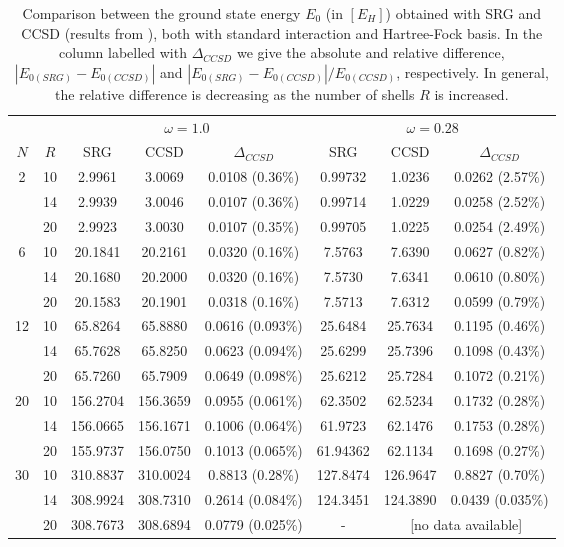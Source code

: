 \begin{table}[h!]
\begin{center}
\begin{tabular}{|c|c|c c c|c c c|}
\hline
\multicolumn{2}{|c|}{} &\multicolumn{3}{|c|}{$\omega=1.0$} &
 \multicolumn{3}{|c|}{$\omega=0.28$}\\
$N$ & $R$ & SRG & CCSD& $\Delta_{CCSD}$ & SRG & CCSD& $\Delta_{CCSD}$ \\
\hline
2 & 10 & 2.9961 & 3.0069 & 0.0108 (0.36\%) & 0.99732 & 1.0236 & 0.0262 (2.57\%)\\
  & 14 & 2.9939 & 3.0046 & 0.0107 (0.36\%) & 0.99714 & 1.0229 & 0.0258 (2.52\%) \\
  & 20 & 2.9923 & 3.0030 & 0.0107 (0.35\%) & 0.99705 & 1.0225 & 0.0254 (2.49\%) \\
\hline
6 & 10 & 20.1841 & 20.2161 & 0.0320 (0.16\%) & 7.5763 & 7.6390 & 0.0627 (0.82\%)\\
  & 14 & 20.1680 & 20.2000 & 0.0320 (0.16\%) & 7.5730 & 7.6341 & 0.0610 (0.80\%)\\
  & 20 & 20.1583 & 20.1901 & 0.0318 (0.16\%) &7.5713 & 7.6312 & 0.0599 (0.79\%)\\
  \hline
12& 10& 65.8264& 65.8880& 0.0616 (0.093\%) &25.6484 & 25.7634& 0.1195 (0.46\%)\\
  & 14& 65.7628& 65.8250& 0.0623 (0.094\%) &25.6299 & 25.7396& 0.1098 (0.43\%)\\
  & 20& 65.7260 & 65.7909& 0.0649 (0.098\%) &25.6212 & 25.7284& 0.1072 (0.21\%)\\
\hline
20 & 10 & 156.2704 & 156.3659 & 0.0955 (0.061\%) &62.3502 &62.5234 & 0.1732 (0.28\%) \\
 & 14 & 156.0665 & 156.1671 &0.1006 (0.064\%) &61.9723 &62.1476 &0.1753 (0.28\%) \\
 & 20 & 155.9737 & 156.0750 & 0.1013 (0.065\%) &61.94362 &62.1134 & 0.1698 (0.27\%) \\
 \hline
30 &10 &310.8837 & 310.0024& 0.8813 (0.28\%) & 127.8474& 126.9647 & 0.8827 (0.70\%)\\
   &14 &308.9924 & 308.7310& 0.2614 (0.084\%)& 124.3451& 124.3890 & 0.0439 (0.035\%) \\
   &20 &308.7673 & 308.6894& 0.0779 (0.025\%) & -& \multicolumn{2}{c|}{[no data available]}\\
\hline\hline
\end{tabular}
\end{center}
\caption{Comparison between the ground state energy $E_0$ (in $[E_H]$) obtained with SRG and CCSD (results from \cite{Christoffer}), both with standard interaction and Hartree-Fock basis. In the column labelled with $\Delta_{CCSD}$ we give the absolute and relative difference, $\left|E_{0(SRG)}-E_{0(CCSD)}\right|$ and $\left|E_{0(SRG)}-E_{0(CCSD)}\right|/E_{0(CCSD)}$, respectively. In general, the relative difference is decreasing as the number of shells $R$ is increased.}
\label{tab:compCCSD}
\end{table}